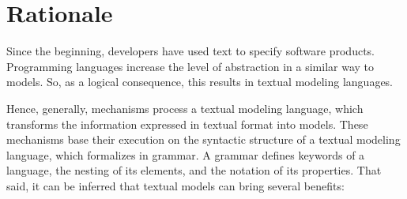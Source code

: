 \section{Rationale} \label{sec:intro_rationale}

Since the beginning, developers have used text to specify software products.
Programming languages increase the level of abstraction in a similar way to models.
So, as a logical consequence, this results in textual modeling languages.

Hence, generally, mechanisms process a textual modeling language, which transforms the information expressed in textual format into models.
These mechanisms base their execution on the syntactic structure of a textual modeling language, which formalizes in grammar.
A grammar defines keywords of a language, the nesting of its elements, and the notation of its properties.
That said, it can be inferred that textual models can bring several benefits:

